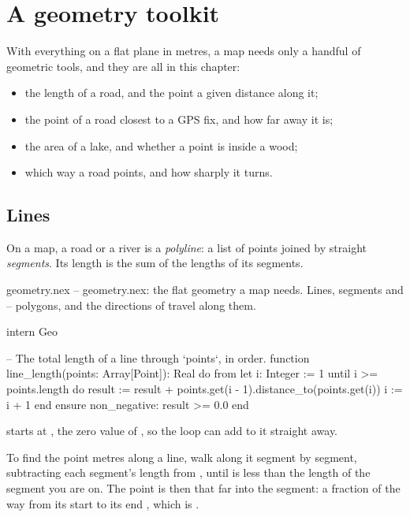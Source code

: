 \chapter{A geometry toolkit}\label{ch:geometry}

With everything on a flat plane in metres, a map needs only a handful of
geometric tools, and they are all in this chapter:

\begin{itemize}[nosep]
  \item the length of a road, and the point a given distance along it;
  \item the point of a road closest to a GPS fix, and how far away it is;
  \item the area of a lake, and whether a point is inside a wood;
  \item which way a road points, and how sharply it turns.
\end{itemize}

\section{Lines}

On a map, a road or a river is a \emph{polyline}: a list of points joined
by straight \emph{segments}. Its length is the sum of the lengths of its
segments.

\begin{newfile}{geometry.nex}
-- geometry.nex: the flat geometry a map needs. Lines, segments and
-- polygons, and the directions of travel along them.

intern Geo

-- The total length of a line through `points`, in order.
function line_length(points: Array[Point]): Real do
  from
    let i: Integer := 1
  until
    i >= points.length
  do
    result := result + points.get(i - 1).distance_to(points.get(i))
    i := i + 1
  end
ensure
  non_negative: result >= 0.0
end
\end{newfile}

 starts at , the zero value of , so the
loop can add to it straight away.

To find the point  metres along a line, walk along it segment by
segment, subtracting each segment's length from , until 
is less than the length of the segment you are on. The point is then that
far into the segment: a fraction  of the way from its
start  to its end , which is .

